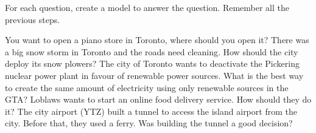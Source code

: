 \begin{exercises}
	For each question, create a model to answer the question. Remember all the previous steps.
	
	\begin{problist}
	
		\prob You want to open a piano store in Toronto, where should you open it? 
		\prob There was a big snow storm in Toronto and the roads need cleaning. How should the city deploy its snow plowers?
		\prob The city of Toronto wants to deactivate the Pickering nuclear power plant in favour of renewable power sources. What is the best way to create the same amount of electricity using only renewable sources in the GTA?
		\prob Loblaws wants to start an online food delivery service. How should they do it?
		\prob The city airport (YTZ) built a tunnel to access the island airport from the city. Before that, they used a ferry. Was building the tunnel a good decision?	
		
		\label{exercises:models}
	\end{problist}
\end{exercises}
